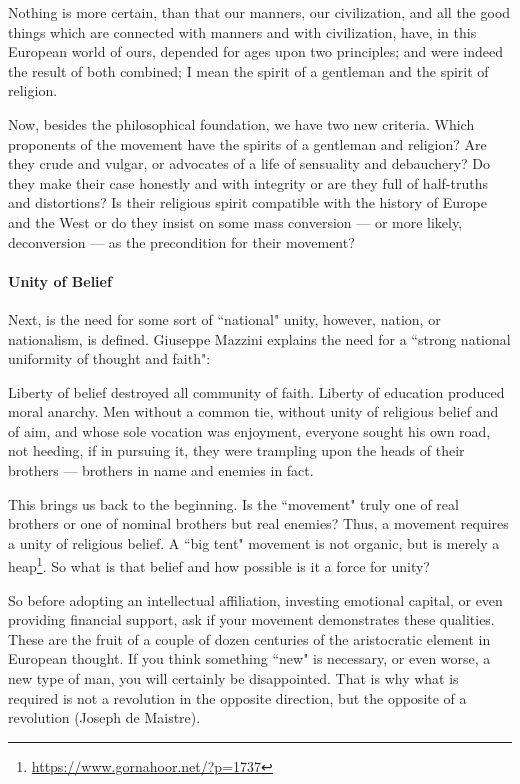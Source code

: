 \begin{quotex}
Nothing is more certain, than that our manners, our civilization, and all the good things which are connected with manners and with civilization, have, in this European world of ours, depended for ages upon two principles; and were indeed the result of both combined; I mean the spirit of a gentleman and the spirit of religion. 

\end{quotex}
Now, besides the philosophical foundation, we have two new criteria. Which proponents of the movement have the spirits of a gentleman and religion? Are they crude and vulgar, or advocates of a life of sensuality and debauchery? Do they make their case honestly and with integrity or are they full of half-truths and distortions? Is their religious spirit compatible with the history of Europe and the West or do they insist on some mass conversion — or more likely, deconversion — as the precondition for their movement?

\paragraph{Unity of Belief}
Next, is the need for some sort of ``national" unity, however, nation, or nationalism, is defined. Giuseppe Mazzini explains the need for a ``strong national uniformity of thought and faith":

\begin{quotex}
Liberty of belief destroyed all community of faith. Liberty of education produced moral anarchy. Men without a common tie, without unity of religious belief and of aim, and whose sole vocation was enjoyment, everyone sought his own road, not heeding, if in pursuing it, they were trampling upon the heads of their brothers — brothers in name and enemies in fact. 

\end{quotex}
This brings us back to the beginning. Is the ``movement" truly one of real brothers or one of nominal brothers but real enemies? Thus, a movement requires a unity of religious belief. A ``big tent" movement is not organic, but is merely a heap\footnote{\url{https://www.gornahoor.net/?p=1737}}. So what is that belief and how possible is it a force for unity?

So before adopting an intellectual affiliation, investing emotional capital, or even providing financial support, ask if your movement demonstrates these qualities. These are the fruit of a couple of dozen centuries of the aristocratic element in European thought. If you think something ``new" is necessary, or even worse, a new type of man, you will certainly be disappointed. That is why what is required is not a revolution in the opposite direction, but the opposite of a revolution (Joseph de Maistre).


